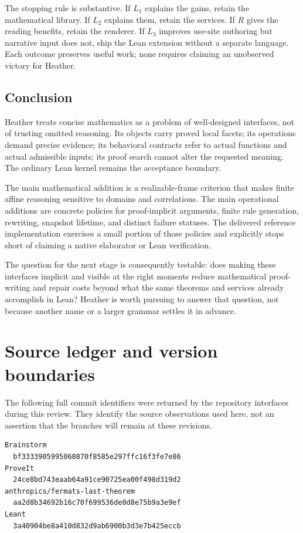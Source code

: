 \documentclass[11pt,letterpaper]{article}
\theoremstyle{definition}\newtheorem{definition}[theorem]{Definition}
\theoremstyle{remark}\newtheorem{remark}[theorem]{Remark}
\begin{document}
The stopping rule is substantive. If $L_1$ explains the gains, retain the
mathematical library. If $L_2$ explains them, retain the services. If $R$ gives
the reading benefits, retain the renderer. If $L_3$ improves use-site authoring
but narrative input does not, ship the Lean extension without a separate
language. Each outcome preserves useful work; none requires claiming an
unobserved victory for Heather.

\subsection{Conclusion}
Heather treats concise mathematics as a problem of well-designed interfaces,
not of trusting omitted reasoning. Its objects carry proved local facets;
its operations demand precise evidence; its behavioral contracts refer to
actual functions and actual admissible inputs; its proof search cannot alter
the requested meaning. The ordinary Lean kernel remains the acceptance
boundary.

The main mathematical addition is a realizable-frame criterion that makes
finite affine reasoning sensitive to domains and correlations. The main
operational additions are concrete policies for proof-implicit arguments,
finite rule generation, rewriting, snapshot lifetime, and distinct failure
statuses. The delivered reference implementation exercises a small portion
of those policies and explicitly stops short of claiming a native elaborator
or Lean verification.

The question for the next stage is consequently testable: does making these
interfaces implicit and visible at the right moments reduce mathematical
proof-writing and repair costs beyond what the same theorems and services
already accomplish in Lean? Heather is worth pursuing to answer that question,
not because another name or a larger grammar settles it in advance.

\clearpage\appendix
\section{Source ledger and version boundaries}\label{app:sources}

The following full commit identifiers were returned by the repository interfaces
during this review. They identify the source observations used here, not an
assertion that the branches will remain at these revisions.
\par\noindent\begin{minipage}{\linewidth}
\begin{lstlisting}
Brainstorm
  bf3333905995060870f8585e297ffc16f3fe7e86
ProveIt
  24ce8bd743eaab64a91ce90725ea00f498d319d2
anthropics/fermats-last-theorem
  aa2d8b34692b16c70f699536de0d8e75b9a3e9ef
Leant
  3a40904be8a410d832d9ab6900b3d3e7b425eccb
\end{lstlisting}
\end{minipage}\par
\end{document}
